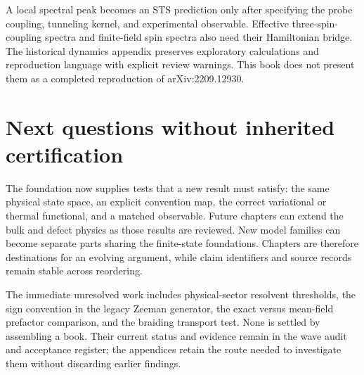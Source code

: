 A local spectral peak becomes an STS prediction only after specifying the
probe coupling, tunneling kernel, and experimental observable. Effective
three-spin-coupling spectra and finite-field spin spectra also need their
Hamiltonian bridge. The historical dynamics appendix preserves exploratory
calculations and reproduction language with explicit review warnings. This
book does not present them as a completed reproduction of arXiv:2209.12930.

\section{Next questions without inherited certification}
The foundation now supplies tests that a new result must satisfy: the same
physical state space, an explicit convention map, the correct variational or
thermal functional, and a matched observable. Future chapters can extend the
bulk and defect physics as those results are reviewed. New model families can
become separate parts sharing the finite-state foundations. Chapters are
therefore destinations for an evolving argument, while claim identifiers and
source records remain stable across reordering.

The immediate unresolved work includes physical-sector resolvent thresholds,
the sign convention in the legacy Zeeman generator, the exact versus mean-field
prefactor comparison, and the braiding transport test. None is settled by
assembling a book. Their current status and evidence remain in the wave audit
and acceptance register; the appendices retain the route needed to investigate
them without discarding earlier findings.
